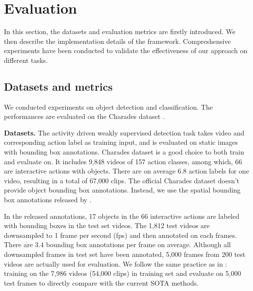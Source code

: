\section{Evaluation}
\label{sec:evaluation}
In this section, the datasets and evaluation metrics are firstly introduced. We then describe the implementation details of the framework. Compreshensive experiments have been conducted to validate the effectiveness of our approach on different tasks.

\subsection{Datasets and metrics}
We conducted experiments on object detection and classification. The performances are evaluated on the Charades dataset \cite{sigurdsson2016hollywood}.

\textbf{Datasets.} The activity driven weakly supervised detection task takes video and corresponding action label as training input, and is evaluated on static images with bounding box annotations. Charades dataset is a good choice to both train and evaluate on. It includes 9,848 videos of 157 action classes, among which, 66 are interactive actions with objects. There are on average 6.8 action labels for one video, resulting in a total of 67,000 clips. The official Charades dataset doesn't provide object bounding box annotations. Instead, we use the spatial bounding box annotations released by \cite{yuan2017temporal}. 

In the released annotations, 17 objects in the 66 interactive actions are labeled with bounding boxes in the test set videos. The 1,812 test videos are downsampled to 1 frame per second (fps) and then annotated on each frames. There are 3.4 bounding box annotations per frame on average. Although all downsampled frames in test set have been annotated, 5,000 frames from 200 test videos are actually used for evaluation. We follow the same practice as in \cite{yuan2017temporal}: training on the 7,986 videos (54,000 clips) in training set and evaluate on 5,000 test frames to directly compare with the current SOTA methods.

